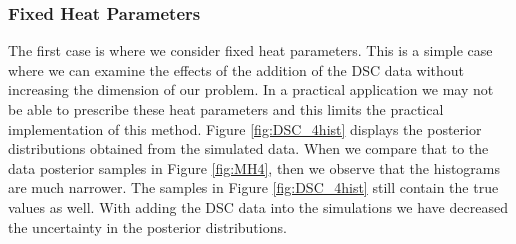 \subsubsection{Fixed Heat Parameters}
The first case is where we consider fixed heat parameters. This is a simple case where we can examine the effects of the addition of the DSC data without increasing the dimension of our problem. In a practical application we may not be able to prescribe these heat parameters and this limits the practical implementation of this method. Figure \ref{fig:DSC_4hist} displays the posterior distributions obtained from the simulated data. When we compare that to the data posterior samples in Figure \ref{fig:MH4}, then we observe that the histograms are much narrower. The samples in Figure \ref{fig:DSC_4hist} still contain the true values as well. With adding the DSC data into the simulations we have decreased the uncertainty in the posterior distributions.\\
%
